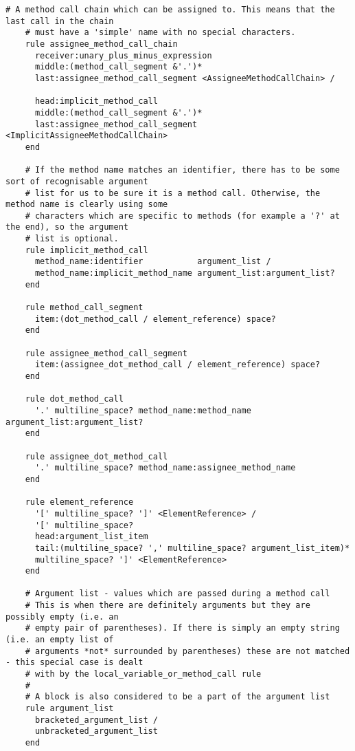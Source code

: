 \begin{lstlisting}[title={\small\Helvetica parser/language.treetop},language=treetop]
    # A method call chain which can be assigned to. This means that the last call in the chain
    # must have a 'simple' name with no special characters.
    rule assignee_method_call_chain
      receiver:unary_plus_minus_expression
      middle:(method_call_segment &'.')*
      last:assignee_method_call_segment <AssigneeMethodCallChain> /
      
      head:implicit_method_call
      middle:(method_call_segment &'.')*
      last:assignee_method_call_segment <ImplicitAssigneeMethodCallChain>
    end
    
    # If the method name matches an identifier, there has to be some sort of recognisable argument
    # list for us to be sure it is a method call. Otherwise, the method name is clearly using some
    # characters which are specific to methods (for example a '?' at the end), so the argument
    # list is optional.
    rule implicit_method_call
      method_name:identifier           argument_list /
      method_name:implicit_method_name argument_list:argument_list?
    end
    
    rule method_call_segment
      item:(dot_method_call / element_reference) space?
    end
    
    rule assignee_method_call_segment
      item:(assignee_dot_method_call / element_reference) space?
    end
    
    rule dot_method_call
      '.' multiline_space? method_name:method_name argument_list:argument_list?
    end
    
    rule assignee_dot_method_call
      '.' multiline_space? method_name:assignee_method_name
    end
    
    rule element_reference
      '[' multiline_space? ']' <ElementReference> /
      '[' multiline_space?
      head:argument_list_item
      tail:(multiline_space? ',' multiline_space? argument_list_item)*
      multiline_space? ']' <ElementReference>
    end
    
    # Argument list - values which are passed during a method call
    # This is when there are definitely arguments but they are possibly empty (i.e. an
    # empty pair of parentheses). If there is simply an empty string (i.e. an empty list of
    # arguments *not* surrounded by parentheses) these are not matched - this special case is dealt
    # with by the local_variable_or_method_call rule
    #
    # A block is also considered to be a part of the argument list
    rule argument_list
      bracketed_argument_list /
      unbracketed_argument_list
    end
    

\end{lstlisting}
